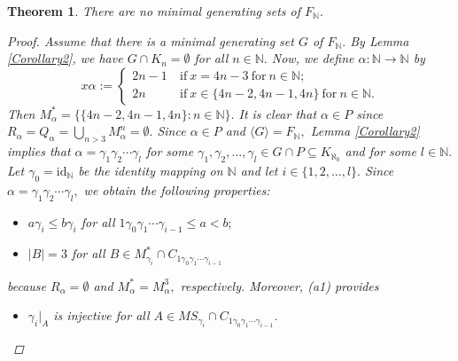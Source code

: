 \documentclass[11pt]{article}
\theoremstyle{plain}
\newtheorem{theorem}{Theorem}[section]
\theoremstyle{definition}
\newcommand{\identity}{\mathrm{id}}
\begin{document}
\begin{theorem}\label{Proposition3}
There are no minimal generating sets of $F_{\mathbb{N}}.$
\begin{proof}
Assume that there is a minimal generating set $G$ of $F_{\mathbb{N}}.$ By Lemma \ref{Corollary2}, we have $G\cap K_{n}=\emptyset$ for all $n\in\mathbb{N}.$ Now, we define $\alpha:\mathbb{N}\to\mathbb{N}$ by
$$x\alpha:=\begin{cases}
2n-1~&\text{if}~x=4n-3~\text{for}~n\in\mathbb{N};\\
2n&\text{if}~x\in\{4n-2,4n-1,4n\}~\text{for}~n\in\mathbb{N}.
\end{cases}$$
Then $M_{\alpha}^{*}=\{\{4n-2,4n-1,4n\}: n\in\mathbb{N}\}.$ It is clear that $\alpha\in P$ since $R_{\alpha}=Q_{\alpha}=\bigcup_{n>3}M^{n}_{\alpha}=\emptyset.$ Since $\alpha\in P$ and $\langle G\rangle=F_{\mathbb{N}},$ Lemma \ref{Corollary2} implies that $\alpha=\gamma_{1}\gamma_{2}\cdots\gamma_{l}$ for some $\gamma_{1},\gamma_{2},\ldots,\gamma_{l}\in G\cap P\subseteq K_{\aleph_{0}}$ and for some $l\in\mathbb{N}.$ Let $\gamma_{0}=\identity_{\mathbb{N}}$ be the identity mapping on $\mathbb{N}$ and let $i\in\{1,2,\ldots,l\}.$ Since $\alpha=\gamma_{1}\gamma_{2}\cdots\gamma_{l},$ we obtain the following properties:
\begin{itemize}
\item[(a1)] $a\gamma_{i}\leq b\gamma_{i}$ for all $1\gamma_{0}\gamma_{1}\cdots\gamma_{i-1}\leq a<b;$
\item[(a2)] $\left\vert B\right\vert=3$ for all $B\in M_{\gamma_{i}}^{*}\cap C_{1\gamma_{0}\gamma_{1}\cdots\gamma_{i-1}}$
\end{itemize}
because $R_{\alpha}=\emptyset$ and $M_{\alpha}^{*}=M_{\alpha}^{3},$ respectively. Moreover, (a1) provides 
\begin{itemize}
\item[(a3)] $\gamma_{i}|_{A}$ is injective for all $A\in MS_{\gamma_{i}}\cap C_{1\gamma_{0}\gamma_{1}\cdots\gamma_{i-1}}.$
\end{itemize} 

\end{proof}
\end{theorem}
\end{document}
